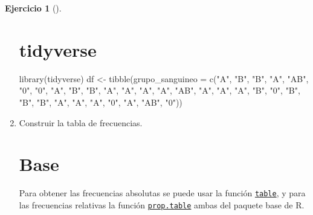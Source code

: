 \documentclass[
  spanish,
  a4paper,
]{scrreport}
\newenvironment{Shaded}{\begin{snugshade}}{\end{snugshade}}
\newcommand{\AttributeTok}[1]{\textcolor[rgb]{0.40,0.45,0.13}{#1}}
\newcommand{\FunctionTok}[1]{\textcolor[rgb]{0.28,0.35,0.67}{#1}}
\newcommand{\NormalTok}[1]{\textcolor[rgb]{0.00,0.23,0.31}{#1}}
\newcommand{\OtherTok}[1]{\textcolor[rgb]{0.00,0.23,0.31}{#1}}
\newcommand{\StringTok}[1]{\textcolor[rgb]{0.13,0.47,0.30}{#1}}
\theoremstyle{definition}
\newtheorem{exercise}{Ejercicio}[chapter]
\theoremstyle{remark}
\begin{document}
\begin{exercise}[]
\begin{enumerate}
\begin{tcolorbox}
  \section{tidyverse}

\begin{Shaded}
\begin{Highlighting}[]
\FunctionTok{library}\NormalTok{(tidyverse)}
\NormalTok{df }\OtherTok{\textless{}{-}} \FunctionTok{tibble}\NormalTok{(}\AttributeTok{grupo\_sanguineo =} \FunctionTok{c}\NormalTok{(}\StringTok{"A"}\NormalTok{, }\StringTok{"B"}\NormalTok{, }\StringTok{"B"}\NormalTok{, }\StringTok{"A"}\NormalTok{, }\StringTok{"AB"}\NormalTok{, }\StringTok{"0"}\NormalTok{, }\StringTok{"0"}\NormalTok{, }\StringTok{"A"}\NormalTok{, }\StringTok{"B"}\NormalTok{, }\StringTok{"B"}\NormalTok{, }\StringTok{"A"}\NormalTok{, }\StringTok{"A"}\NormalTok{, }\StringTok{"A"}\NormalTok{, }\StringTok{"A"}\NormalTok{, }\StringTok{"AB"}\NormalTok{, }\StringTok{"A"}\NormalTok{, }\StringTok{"A"}\NormalTok{, }\StringTok{"A"}\NormalTok{, }\StringTok{"B"}\NormalTok{, }\StringTok{"0"}\NormalTok{, }\StringTok{"B"}\NormalTok{, }\StringTok{"B"}\NormalTok{, }\StringTok{"B"}\NormalTok{, }\StringTok{"A"}\NormalTok{, }\StringTok{"A"}\NormalTok{, }\StringTok{"A"}\NormalTok{, }\StringTok{"0"}\NormalTok{, }\StringTok{"A"}\NormalTok{, }\StringTok{"AB"}\NormalTok{, }\StringTok{"0"}\NormalTok{))}
\end{Highlighting}
\end{Shaded}

  \end{tcolorbox}
\item
  Construir la tabla de frecuencias.

  \begin{tcolorbox}[enhanced jigsaw, colback=white, coltitle=black, toprule=.15mm, rightrule=.15mm, opacitybacktitle=0.6, opacityback=0, bottomtitle=1mm, toptitle=1mm, titlerule=0mm, breakable, leftrule=.75mm, title=\textcolor{quarto-callout-tip-color}{\faLightbulb}\hspace{0.5em}{Solución}, arc=.35mm, left=2mm, bottomrule=.15mm, colframe=quarto-callout-tip-color-frame, colbacktitle=quarto-callout-tip-color!10!white]

  \section{Base}

  Para obtener las frecuencias absolutas se puede usar la función
  \href{https://www.rdocumentation.org/packages/base/versions/3.6.2/topics/table}{\texttt{table}},
  y para las frecuencias relativas la función
  \href{https://www.rdocumentation.org/packages/base/versions/3.6.2/topics/prop.table}{\texttt{prop.table}}
  ambas del paquete base de R.


\end{tcolorbox}
\end{enumerate}
\end{exercise}
\end{document}
